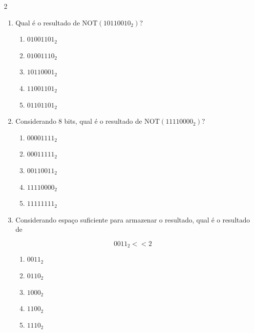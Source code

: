 \documentclass[a4paper,12pt]{article}
\begin{document}
\begin{multicols}{2}
\begin{enumerate}[leftmargin=*]
\vspace{0.2cm}



\item Qual é o resultado de
$\mathrm{NOT}(10110010_2)$?

\begin{enumerate}[label=(\Alph*)]
    \item $01001101_2$
    \item $01001110_2$
    \item $10110001_2$
    \item $11001101_2$
    \item $01101101_2$
\end{enumerate}

\vspace{0.2cm}


\item Considerando 8 bits, qual é o resultado de
$\mathrm{NOT}(11110000_2)$?

\begin{enumerate}[label=(\Alph*)]
    \item $00001111_2$
    \item $00011111_2$
    \item $00110011_2$
    \item $11110000_2$
    \item $11111111_2$
\end{enumerate}

\vspace{0.2cm}



\item Considerando espaço suficiente para armazenar o resultado,
qual é o resultado de

\[
0011_2 << 2
\]

\begin{enumerate}[label=(\Alph*)]
    \item $0011_2$
    \item $0110_2$
    \item $1000_2$
    \item $1100_2$
    \item $1110_2$
\end{enumerate}

\vspace{0.2cm}



\end{enumerate}
\end{multicols}
\end{document}
